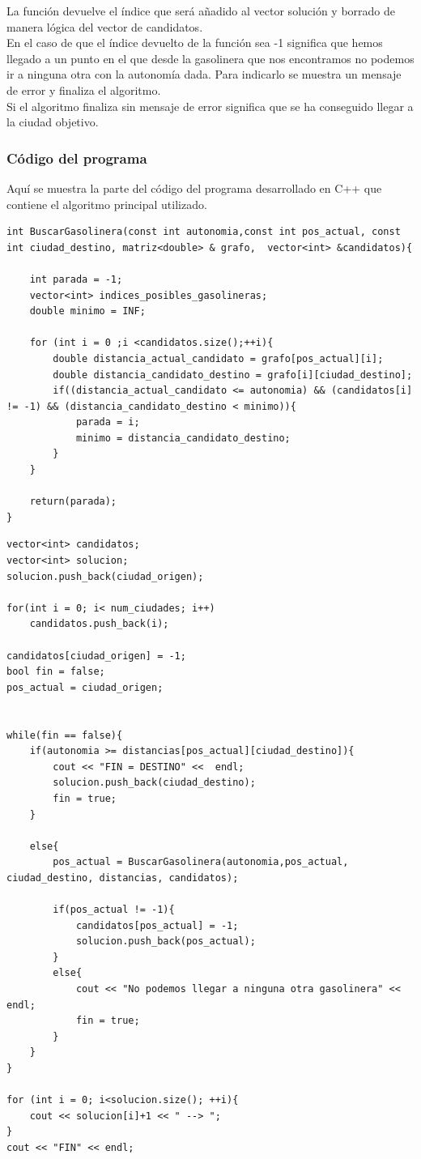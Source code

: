 \documentclass[11pt,a4paper]{article} %
\begin{document}
La función devuelve el índice que será añadido al vector solución y borrado de manera lógica del vector de candidatos.\\

En el caso de que el índice devuelto de la función sea -1 significa que hemos llegado a un punto en el que desde la gasolinera que nos encontramos no podemos ir a ninguna otra con la autonomía dada. Para indicarlo se muestra un mensaje de error y finaliza el algoritmo.\\

Si el algoritmo finaliza sin mensaje de error significa que se ha conseguido llegar a la ciudad objetivo.\\

\subsubsection{Código del programa}
Aquí se muestra la parte del código del programa desarrollado en C++ que contiene el algoritmo principal utilizado.

\begin{lstlisting}[style=C++]
int BuscarGasolinera(const int autonomia,const int pos_actual, const int ciudad_destino, matriz<double> & grafo,  vector<int> &candidatos){

	int parada = -1;
	vector<int> indices_posibles_gasolineras;
	double minimo = INF;
	
	for (int i = 0 ;i <candidatos.size();++i){
		double distancia_actual_candidato = grafo[pos_actual][i];
		double distancia_candidato_destino = grafo[i][ciudad_destino];
		if((distancia_actual_candidato <= autonomia) && (candidatos[i] != -1) && (distancia_candidato_destino < minimo)){
			parada = i;
			minimo = distancia_candidato_destino;
		}
	}
	
	return(parada);
}
\end{lstlisting}
\begin{lstlisting}[style=C++]
vector<int> candidatos;
vector<int> solucion;
solucion.push_back(ciudad_origen);

for(int i = 0; i< num_ciudades; i++)
	candidatos.push_back(i);

candidatos[ciudad_origen] = -1;
bool fin = false;
pos_actual = ciudad_origen;


while(fin == false){
	if(autonomia >= distancias[pos_actual][ciudad_destino]){
		cout << "FIN = DESTINO" <<  endl;
		solucion.push_back(ciudad_destino);
		fin = true;
	}

	else{
		pos_actual = BuscarGasolinera(autonomia,pos_actual, ciudad_destino, distancias, candidatos);
	
		if(pos_actual != -1){
			candidatos[pos_actual] = -1;
			solucion.push_back(pos_actual);
		}
		else{
			cout << "No podemos llegar a ninguna otra gasolinera" << endl;
			fin = true;
		}
	}
}

for (int i = 0; i<solucion.size(); ++i){
	cout << solucion[i]+1 << " --> ";
}
cout << "FIN" << endl;
\end{lstlisting}
\end{document}
